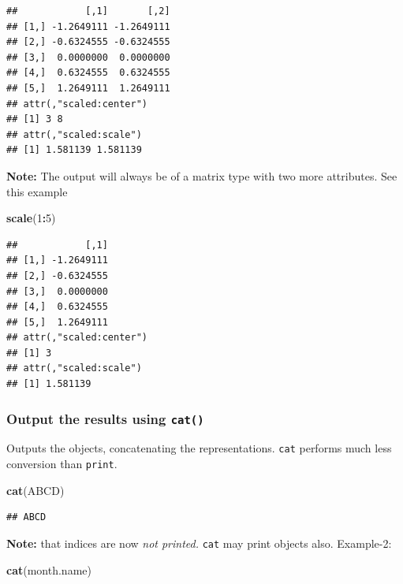 \documentclass[
]{book}
\newenvironment{Shaded}{\begin{snugshade}}{\end{snugshade}}
\newcommand{\DecValTok}[1]{\textcolor[rgb]{0.00,0.00,0.81}{#1}}
\newcommand{\FunctionTok}[1]{\textcolor[rgb]{0.13,0.29,0.53}{\textbf{#1}}}
\newcommand{\NormalTok}[1]{#1}
\newcommand{\SpecialCharTok}[1]{\textcolor[rgb]{0.81,0.36,0.00}{\textbf{#1}}}
\newcommand{\StringTok}[1]{\textcolor[rgb]{0.31,0.60,0.02}{#1}}
\begin{document}
\begin{verbatim}
##            [,1]       [,2]
## [1,] -1.2649111 -1.2649111
## [2,] -0.6324555 -0.6324555
## [3,]  0.0000000  0.0000000
## [4,]  0.6324555  0.6324555
## [5,]  1.2649111  1.2649111
## attr(,"scaled:center")
## [1] 3 8
## attr(,"scaled:scale")
## [1] 1.581139 1.581139
\end{verbatim}

\textbf{Note:} The output will always be of a matrix type with two more attributes. See this example

\begin{Shaded}
\begin{Highlighting}[]
\FunctionTok{scale}\NormalTok{(}\DecValTok{1}\SpecialCharTok{:}\DecValTok{5}\NormalTok{)}
\end{Highlighting}
\end{Shaded}

\begin{verbatim}
##            [,1]
## [1,] -1.2649111
## [2,] -0.6324555
## [3,]  0.0000000
## [4,]  0.6324555
## [5,]  1.2649111
## attr(,"scaled:center")
## [1] 3
## attr(,"scaled:scale")
## [1] 1.581139
\end{verbatim}

\hypertarget{cat}{%
\subsubsection*{\texorpdfstring{Output the results using \texttt{cat()}}{Output the results using cat()}}\label{cat}}

Outputs the objects, concatenating the representations. \texttt{cat} performs much less conversion than \texttt{print}.

\begin{Shaded}
\begin{Highlighting}[]
\FunctionTok{cat}\NormalTok{(}\StringTok{\textquotesingle{}ABCD\textquotesingle{}}\NormalTok{)}
\end{Highlighting}
\end{Shaded}

\begin{verbatim}
## ABCD
\end{verbatim}

\textbf{Note:} that indices are now \emph{not printed.} \texttt{cat} may print objects also. Example-2:

\begin{Shaded}
\begin{Highlighting}[]
\FunctionTok{cat}\NormalTok{(month.name)}
\end{Highlighting}
\end{Shaded}
\end{document}
